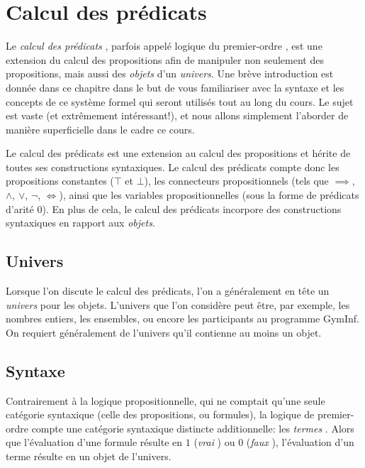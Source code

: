 
\chapter{Calcul des prédicats}

Le \og \textit{calcul des prédicats} \fg{}, parfois appelé \og logique du premier-ordre \fg{}, est une extension du calcul des propositions afin de manipuler non seulement des propositions, mais aussi des \textit{objets} d'un \textit{univers}.
Une brève introduction est donnée dans ce chapitre dans le but de vous familiariser avec la syntaxe et les concepts de ce système formel qui seront utilisés tout au long du cours.
Le sujet est vaste (et extrêmement intéressant!), et nous allons simplement l'aborder de manière superficielle dans le cadre ce cours.

Le calcul des prédicats est une extension au calcul des propositions et hérite de toutes ses constructions syntaxiques.
Le calcul des prédicats compte donc les propositions constantes ($\top$ et $\bot$), les connecteurs propositionnels (tels que $\implies$, $\wedge$, $\vee$, $\neg$, $\iff$), ainsi que les variables propositionnelles (sous la forme de prédicats d'arité $0$).
En plus de cela, le calcul des prédicats incorpore des constructions syntaxiques en rapport aux \textit{objets}.

\section{Univers}

Lorsque l'on discute le calcul des prédicats, l'on a généralement en tête un \og \textit{univers} \fg{} pour les objets.
L'univers que l'on considère peut être, par exemple, les nombres entiers, les ensembles, ou encore les participants au programme GymInf.
On requiert généralement de l'univers qu'il contienne au moins un objet.

\section{Syntaxe}

Contrairement à la logique propositionnelle, qui ne comptait qu'une seule catégorie syntaxique (celle des propositions, ou formules), la logique de premier-ordre compte une catégorie syntaxique distincte additionnelle: les \og \textit{termes} \fg{}.
Alors que l'évaluation d'une formule résulte en $1$ (\og \textit{vrai} \fg{}) ou $0$ (\og \textit{faux} \fg{}), l'évaluation d'un terme résulte en un objet de l'univers.

